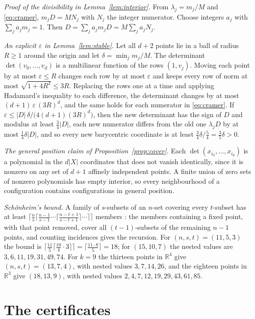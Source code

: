 \documentclass[aps,prd,twocolumn,superscriptaddress,nofootinbib,longbibliography,floatfix,showkeys,amsmath,amssymb,10pt]{revtex4-2}
\theoremstyle{plain}
\theoremstyle{definition}
\theoremstyle{plain}
\newcommand{\R}{\mathbb{R}}
\begin{document}
\emph{Proof of the divisibility in Lemma~\ref{lem:interior}.} From $\lambda_j=m_j/M$ and \eqref{eq:cramer}, $m_jD=MN_j$ with $N_j$ the integer numerator. Choose integers $a_j$ with $\sum_ja_jm_j=1$. Then $D=\sum_ja_jm_jD=M\sum_ja_jN_j$.

\emph{An explicit $\varepsilon$ in Lemma~\ref{lem:stable}.} Let all $d+2$ points lie in a ball of radius $R\ge1$ around the origin and let $\delta=\min_j m_j/M$. The determinant $\det(v_0,\dots,v_d)$ is a multilinear function of the rows $(1,v_j)$. Moving each point by at most $\varepsilon\le R$ changes each row by at most $\varepsilon$ and keeps every row of norm at most $\sqrt{1+4R^2}\le3R$. Replacing the rows one at a time and applying Hadamard's inequality to each difference, the determinant changes by at most $(d+1)\,\varepsilon\,(3R)^{d}$, and the same holds for each numerator in \eqref{eq:cramer}. If $\varepsilon\le|D|\,\delta/\bigl(4(d+1)(3R)^d\bigr)$, then the new determinant has the sign of $D$ and modulus at least $\tfrac34|D|$, each new numerator differs from the old one $\lambda_jD$ by at most $\tfrac14\delta|D|$, and so every new barycentric coordinate is at least $\frac34\delta/\frac54=\frac35\delta>0$.

\emph{The general position claim of Proposition~\ref{prop:cover}.} Each $\det(x_{i_0},\dots,x_{i_d})$ is a polynomial in the $d|X|$ coordinates that does not vanish identically, since it is nonzero on any set of $d+1$ affinely independent points. A finite union of zero sets of nonzero polynomials has empty interior, so every neighbourhood of a configuration contains configurations in general position.

\emph{Sch\"onheim's bound.} A family of $s$-subsets of an $n$-set covering every $t$-subset has at least $\lceil\frac{n}{s}\lceil\frac{n-1}{s-1}\cdots\lceil\frac{n-t+1}{s-t+1}\rceil\cdots\rceil\rceil$ members \cite{Sch64}: the members containing a fixed point, with that point removed, cover all $(t-1)$-subsets of the remaining $n-1$ points, and counting incidences gives the recursion. For $(n,s,t)=(11,5,3)$ the bound is $\lceil\frac{11}{5}\lceil\frac{10}{4}\cdot3\rceil\rceil=\lceil\frac{11\cdot8}{5}\rceil=18$; for $(15,10,7)$ the nested values are $3,6,11,19,31,49,74$. For $k=9$ the thirteen points in $\R^4$ give $(n,s,t)=(13,7,4)$, with nested values $3,7,14,26$, and the eighteen points in $\R^3$ give $(18,13,9)$, with nested values $2,4,7,12,19,29,43,61,85$.

\section{The certificates}\label{app:certA}\label{app:certB}
\end{document}
